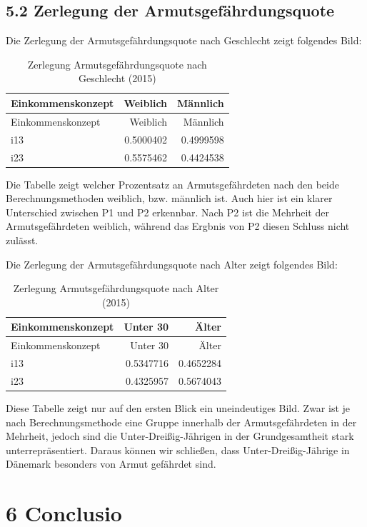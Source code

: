 \documentclass[ngerman,]{article}
\begin{document}
\subsection{5.2 Zerlegung der
Armutsgefährdungsquote}\label{zerlegung-der-armutsgefahrdungsquote}

Die Zerlegung der Armutsgefährdungsquote nach Geschlecht zeigt folgendes
Bild:

\begin{longtable}[]{@{}lrr@{}}
\caption{Zerlegung Armutsgefährdungsquote nach Geschlecht
(2015)}\tabularnewline
\toprule
Einkommenskonzept & Weiblich & Männlich\tabularnewline
\midrule
\endfirsthead
\toprule
Einkommenskonzept & Weiblich & Männlich\tabularnewline
\midrule
\endhead
i13 & 0.5000402 & 0.4999598\tabularnewline
i23 & 0.5575462 & 0.4424538\tabularnewline
\bottomrule
\end{longtable}

Die Tabelle zeigt welcher Prozentsatz an Armutsgefährdeten nach den
beide Berechnungsmethoden weiblich, bzw. männlich ist. Auch hier ist ein
klarer Unterschied zwischen P1 und P2 erkennbar. Nach P2 ist die
Mehrheit der Armutsgefährdeten weiblich, während das Ergbnis von P2
diesen Schluss nicht zulässt.

Die Zerlegung der Armutsgefährdungsquote nach Alter zeigt folgendes
Bild:

\begin{longtable}[]{@{}lrr@{}}
\caption{Zerlegung Armutsgefährdungsquote nach Alter
(2015)}\tabularnewline
\toprule
Einkommenskonzept & Unter 30 & Älter\tabularnewline
\midrule
\endfirsthead
\toprule
Einkommenskonzept & Unter 30 & Älter\tabularnewline
\midrule
\endhead
i13 & 0.5347716 & 0.4652284\tabularnewline
i23 & 0.4325957 & 0.5674043\tabularnewline
\bottomrule
\end{longtable}

Diese Tabelle zeigt nur auf den ersten Blick ein uneindeutiges Bild.
Zwar ist je nach Berechnungsmethode eine Gruppe innerhalb der
Armutsgefährdeten in der Mehrheit, jedoch sind die
Unter-Dreißig-Jährigen in der Grundgesamtheit stark unterrepräsentiert.
Daraus können wir schließen, dass Unter-Dreißig-Jährige in Dänemark
besonders von Armut gefährdet sind.

\section{6 Conclusio}\label{conclusio}
\end{document}
